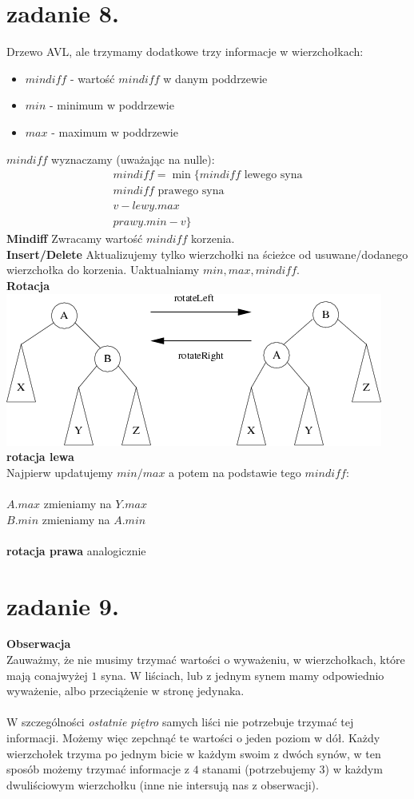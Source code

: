 \documentclass{article}
\begin{document}
\section{zadanie 8.}
Drzewo AVL, ale trzymamy dodatkowe trzy informacje w wierzchołkach:
\begin{itemize}
  \item $mindiff$ - wartość $mindiff$ w danym poddrzewie
  \item $min$ - minimum w poddrzewie
  \item $max$ - maximum w poddrzewie
\end{itemize}
$mindiff$ wyznaczamy (uważając na nulle):
\begin{align*}
mindiff = \min \{ 
  mindiff \text{  lewego syna}\\
  mindiff \text{  prawego syna}\\
  v - lewy.max\\
  prawy.min - v\}
\end{align*}
\textbf{Mindiff} Zwracamy wartość $mindiff$ korzenia.\\
\textbf{Insert/Delete} Aktualizujemy tylko wierzchołki na ścieżce od usuwane/dodanego wierzchołka do korzenia. Uaktualniamy $min, max, mindiff$.\\
\textbf{Rotacja}\\
\includegraphics[scale=0.7]{rotacje}\\
\textbf{rotacja lewa}\\
Najpierw updatujemy $min/max$ a potem na podstawie tego $mindiff$:\\\\
$A.max$ zmieniamy na $Y.max$\\
$B.min$ zmieniamy na $A.min$\\\\
\textbf{rotacja prawa} analogicznie\\
\clearpage
\section{zadanie 9.}
\textbf{Obserwacja}\\
Zauważmy, że nie musimy trzymać wartości o wyważeniu, w wierzchołkach, które mają conajwyżej $1$ syna. W liściach, lub z jednym synem mamy odpowiednio wyważenie, albo przeciążenie w stronę jedynaka.\\\\
W szczególności \textit{ostatnie piętro} samych liści nie potrzebuje trzymać tej informacji. Możemy więc zepchnąć te wartości o jeden poziom w dół. Każdy wierzchołek trzyma po jednym bicie w każdym swoim z dwóch synów, w ten sposób możemy trzymać informacje z $4$ stanami (potrzebujemy $3$) w każdym dwuliściowym wierzchołku (inne nie intersują nas z obserwacji).
\end{document}
